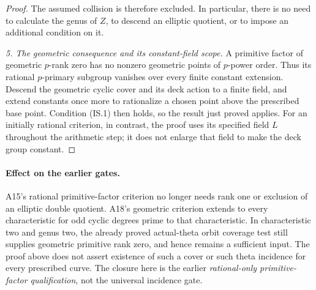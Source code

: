 \begin{proof}
The assumed collision is therefore excluded. In particular,
there is no need to calculate the genus of $Z$, to descend an
elliptic quotient, or to impose an additional condition on it.

\emph{5. The geometric consequence and its constant-field scope.}
A primitive factor of geometric $p$-rank zero has no nonzero
geometric points of $p$-power order. Thus its rational
$p$-primary subgroup vanishes over every finite constant
extension. Descend the geometric cyclic cover and its deck
action to a finite field, and extend constants once more to
rationalize a chosen point above the prescribed base point.
Condition (IS.1) then holds, so the result just proved applies.
For an initially rational criterion, in contrast, the proof
uses its specified field $L$ throughout the arithmetic step;
it does not enlarge that field to make the deck group constant.
\end{proof}

\paragraph{Effect on the earlier gates.}
A15's rational primitive-factor criterion no longer needs
rank one or exclusion of an elliptic double quotient. A18's
geometric criterion extends to every characteristic for odd
cyclic degrees prime to that characteristic. In characteristic
two and genus two, the already proved actual-theta orbit
coverage test still supplies geometric primitive rank zero,
and hence remains a sufficient input. The proof above does
not assert existence of such a cover or such theta incidence
for every prescribed curve. The closure here is the earlier
\emph{rational-only primitive-factor qualification}, not the
universal incidence gate.
